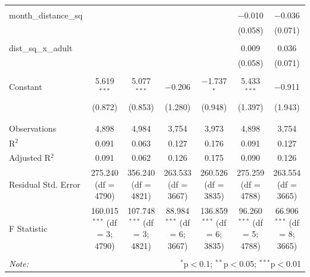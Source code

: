 \documentclass{beamer}
\begin{document}
\begin{frame}
\begin{table}[!htbp]
{\begin{tabular}{@{\extracolsep{5pt}}lcccccc}
		& & & & & & \\ 
		month\_distance\_sq &  &  &  &  & $-$0.010 & $-$0.036 \\ 
		&  &  &  &  & (0.058) & (0.071) \\ 
		& & & & & & \\ 
		dist\_sq\_x\_adult &  &  &  &  & 0.009 & 0.036 \\ 
		&  &  &  &  & (0.058) & (0.071) \\ 
		& & & & & & \\ 
		Constant & 5.619$^{***}$ & 5.077$^{***}$ & $-$0.206 & $-$1.737$^{*}$ & 5.433$^{***}$ & $-$0.911 \\ 
		& (0.872) & (0.853) & (1.280) & (0.948) & (1.397) & (1.943) \\ 
		& & & & & & \\ 
		\hline \\[-1.8ex] 
		Observations & 4,898 & 4,984 & 3,754 & 3,973 & 4,898 & 3,754 \\ 
		R$^{2}$ & 0.091 & 0.063 & 0.127 & 0.176 & 0.091 & 0.127 \\ 
		Adjusted R$^{2}$ & 0.091 & 0.062 & 0.126 & 0.175 & 0.090 & 0.126 \\ 
		Residual Std. Error & 275.240 (df = 4790) & 356.240 (df = 4821) & 263.533 (df = 3667) & 260.526 (df = 3835) & 275.259 (df = 4788) & 263.554 (df = 3665) \\ 
		F Statistic & 160.015$^{***}$ (df = 3; 4790) & 107.748$^{***}$ (df = 3; 4821) & 88.984$^{***}$ (df = 6; 3667) & 136.859$^{***}$ (df = 6; 3835) & 96.260$^{***}$ (df = 5; 4788) & 66.906$^{***}$ (df = 8; 3665) \\ 
		\hline 
		\hline \\[-1.8ex] 
		\textit{Note:}  & \multicolumn{6}{r}{$^{*}$p$<$0.1; $^{**}$p$<$0.05; $^{***}$p$<$0.01} \\ 
	\end{tabular} }
\end{table} 
\end{frame}
\end{document}
